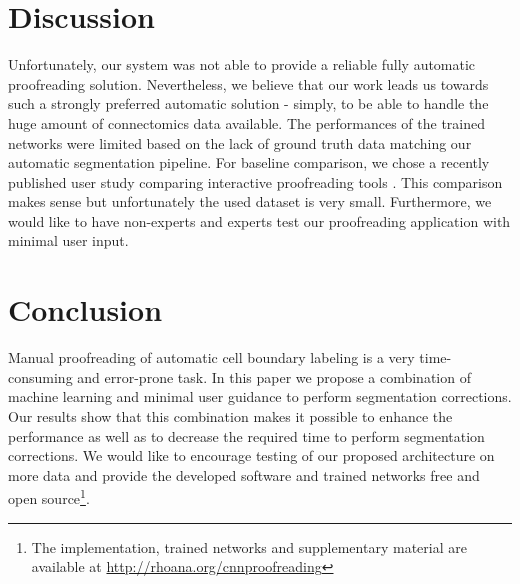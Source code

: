 \section{Discussion}

Unfortunately, our system was not able to provide a reliable fully automatic proofreading solution. Nevertheless, we believe that our work leads us towards such a strongly preferred automatic solution - simply, to be able to handle the huge amount of connectomics data available. The performances of the trained networks were limited based on the lack of ground truth data matching our automatic segmentation pipeline. For baseline comparison, we chose a recently published user study comparing interactive proofreading tools \cite{haehn_dojo_2014}. This comparison makes sense but unfortunately the used dataset is very small. Furthermore, we would like to have non-experts and experts test our proofreading application with minimal user input.

\section{Conclusion}

Manual proofreading of automatic cell boundary labeling is a very time-consuming and error-prone task. In this paper we propose a combination of machine learning and minimal user guidance to perform segmentation corrections. Our results show that this combination makes it possible to enhance the performance as well as to decrease the required time to perform segmentation corrections. We would like to encourage testing of our proposed architecture on more data and provide the developed software and trained networks free and open source\footnote{The implementation, trained networks and supplementary material are available at \url{http://rhoana.org/cnnproofreading}}.